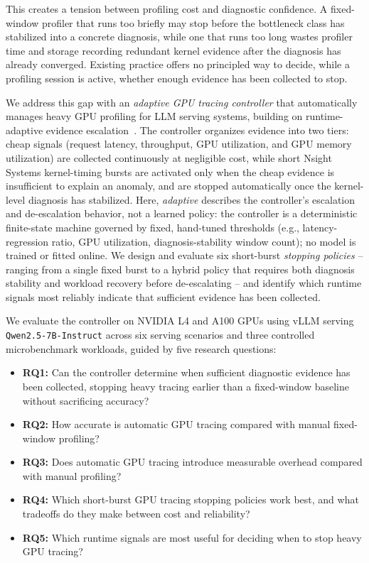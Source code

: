 This creates a tension between profiling cost and diagnostic confidence. A fixed-window profiler that runs too briefly may stop before the bottleneck class has stabilized into a concrete diagnosis, while one that runs too long wastes profiler time and storage recording redundant kernel evidence after the diagnosis has already converged. Existing practice offers no principled way to decide, while a profiling session is active, whether enough evidence has been collected to stop.

We address this gap with an \emph{adaptive GPU tracing controller} that automatically manages heavy GPU profiling for LLM serving systems, building on runtime-adaptive evidence escalation~\cite{mace2015pivot,zhang2023hindsight}. The controller organizes evidence into two tiers: cheap signals (request latency, throughput, GPU utilization, and GPU memory utilization) are collected continuously at negligible cost, while short Nsight Systems kernel-timing bursts are activated only when the cheap evidence is insufficient to explain an anomaly, and are stopped automatically once the kernel-level diagnosis has stabilized. Here, \emph{adaptive} describes the controller's escalation and de-escalation behavior, not a learned policy: the controller is a deterministic finite-state machine governed by fixed, hand-tuned thresholds (e.g., latency-regression ratio, GPU utilization, diagnosis-stability window count); no model is trained or fitted online. We design and evaluate six short-burst \emph{stopping policies} -- ranging from a single fixed burst to a hybrid policy that requires both diagnosis stability and workload recovery before de-escalating -- and identify which runtime signals most reliably indicate that sufficient evidence has been collected.

We evaluate the controller on NVIDIA L4 and A100 GPUs using vLLM serving \texttt{Qwen2.5-7B-Instruct} across six serving scenarios and three controlled microbenchmark workloads, guided by five research questions:

\begin{itemize}
  \item \textbf{RQ1:} Can the controller determine when sufficient diagnostic evidence has been collected, stopping heavy tracing earlier than a fixed-window baseline without sacrificing accuracy?
  \item \textbf{RQ2:} How accurate is automatic GPU tracing compared with manual fixed-window profiling?
  \item \textbf{RQ3:} Does automatic GPU tracing introduce measurable overhead compared with manual profiling?
  \item \textbf{RQ4:} Which short-burst GPU tracing stopping policies work best, and what tradeoffs do they make between cost and reliability?
  \item \textbf{RQ5:} Which runtime signals are most useful for deciding when to stop heavy GPU tracing?
\end{itemize}

